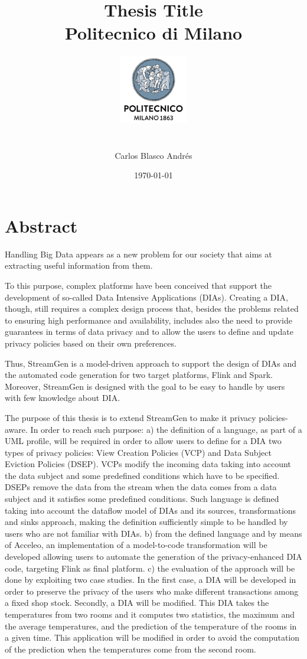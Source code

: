 \documentclass[12pt,twoside]{book}
\title{
{Thesis Title}\\
{\large Politecnico di Milano}\\
{\includegraphics[width=3cm, height=4cm]{university.png}}
}
\author{Carlos Blasco Andrés}
\date{\today}
\begin{document}
\maketitle

\chapter*{Abstract}
Handling Big Data appears as a new problem for our society that aims at extracting useful information from them.

To this purpose, complex platforms have been conceived that support the development of so-called Data Intensive Applications (DIAs). Creating a DIA, though, still requires a complex design process that, besides the problems related to ensuring high performance and availability, includes also the need to provide guarantees in terms of data privacy and to allow the users to define and update privacy policies based on their own preferences.

Thus, StreamGen is a model-driven approach to support the design of DIAs and the automated code generation for two target platforms, Flink and Spark. Moreover, StreamGen is designed with the goal to be easy to handle by users with few knowledge about DIA.

The purpose of this thesis is to extend StreamGen to make it privacy policies-aware. In order to reach such purpose:
a) the definition of a language, as part of a UML profile, will be required in order to allow users to define for a DIA two types of privacy policies: View Creation Policies (VCP) and Data Subject Eviction Policies (DSEP). VCPs modify the incoming data taking into account the data subject and some predefined conditions which have to be specified. DSEPs remove the data from the stream when the data comes from a data subject and it satisfies some predefined conditions. Such language is defined taking into account the dataflow model of DIAs and its sources, transformations and sinks approach, making the definition sufficiently simple to be handled by users who are not familiar with DIAs.
b) from the defined language and by means of Acceleo, an implementation of a model-to-code transformation will be developed allowing users to automate the generation of the privacy-enhanced DIA code, targeting Flink as final platform.
c) the evaluation of the approach will be done by exploiting two case studies. In the first case, a DIA will be developed in order to preserve the privacy of the users who make different transactions among a fixed shop stock. Secondly, a DIA will be modified. This DIA takes the temperatures from two rooms and it computes two statistics, the maximum and the average temperatures, and the prediction of the temperature of the rooms in a given time. This application will be modified in order to avoid the computation of the prediction when the temperatures come from the second room.
\end{document}
